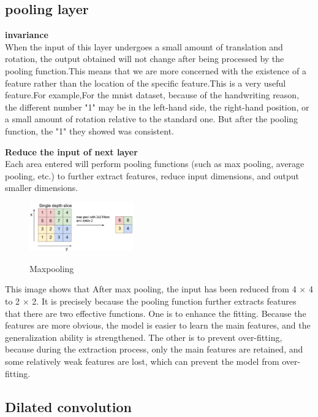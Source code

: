 \documentclass{article}
\begin{document}
\subsection{pooling layer}

\textbf{invariance}\\
When the input of this layer undergoes a small amount of translation and rotation, the output obtained will not change after being processed by the pooling function\cite{deeplearning2016}.This means that we are more concerned with the existence of a feature rather than the location of the specific feature.This is a very useful feature.For example,For the mnist dataset, because of the handwriting reason, the different number "1" may be in the left-hand side, the right-hand position, or a small amount of rotation relative to the standard one. But after the pooling function, the "1" they showed was consistent.

\textbf{Reduce the input of next layer}\\
Each area entered will perform pooling functions (such as max pooling, average pooling, etc.) to further extract features, reduce input dimensions, and output smaller dimensions.
\begin{figure}[H] %
	\centering %
	\includegraphics[width=0.4\textwidth]{./pic/part1/maxpool.jpeg} %
	\caption{Maxpooling} %
	\label{Fig.main2} %
	\cite{cs231n}
\end{figure}
This image shows that After max pooling, the input has been reduced from 4 $\times$ 4 to 2 $\times$ 2.
It is precisely because the pooling function further extracts features that there are two effective functions. One is to enhance the fitting. Because the features are more obvious, the model is easier to learn the main features, and the generalization ability is strengthened. The other is to prevent over-fitting, because during the extraction process, only the main features are retained, and some relatively weak features are lost, which can prevent the model from over-fitting.

\subsection{Dilated convolution}
\end{document}
